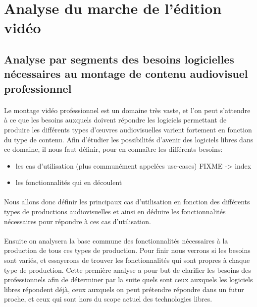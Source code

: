 \newpage

\section {Analyse du marche de l'édition vidéo}

\subsection{Analyse par segments des besoins logicielles nécessaires au montage
  de contenu audiovisuel professionnel}

\paragraph{}
Le montage vidéo professionnel est un domaine très vaste, et l'on peut
s'attendre à ce que les besoins auxquels doivent répondre les logiciels
permettant de produire les différents types d'œuvres audiovisuelles
varient fortement en fonction du type de contenu. Afin d'étudier
les possibilités d'avenir des logiciels libres dans ce domaine, il nous faut
définir, pour en connaître les différents besoins:
\begin {itemize}
  \item {les cas d'utilisation (plus communément appelées use-cases) FIXME -> index}
  \item {les fonctionnalités qui en découlent}
\end{itemize}


\paragraph{}
Nous allons donc définir les principaux cas d'utilisation en fonction des
différents types de productions audiovisuelles et ainsi en déduire les fonctionnalités
nécessaires pour répondre à ces cas d'utilisation.

\paragraph{}
Ensuite on analysera la base commune des fonctionnalités nécessaires à la
production de tous ces types de production.  Pour finir
nous verrons si les besoins sont variés, et essayerons de trouver les
fonctionnalités qui sont propres à chaque type de production. Cette première
analyse a pour but de clarifier les besoins des professionnels afin de
déterminer par la suite quels sont ceux auxquels les logiciels libres répondent déjà,
ceux auxquels on peut prétendre répondre dans un futur proche, et ceux qui
sont hors du scope actuel des technologies libres.

